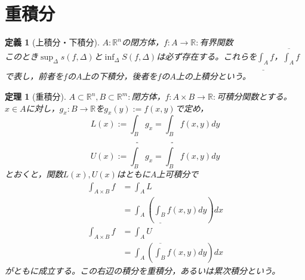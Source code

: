 \documentclass[dvipdfmx,a4j,10pt]{jsarticle}
\theoremstyle{mystyle1}
\newtheorem{thm}[dfn]{定理}
\theoremstyle{mystyle2}
\newtheorem{dfn*}{定義}
\begin{document}
\section{重積分}
\begin{dfn*}[上積分・下積分]
	$A:\mathbb{R}^n$の閉方体，$f:A\to\mathbb{R}:$有界関数\\
このとき$\displaystyle\sup_{\Delta}s(f,\Delta)$と$\displaystyle\inf_{\Delta}S(f,\Delta)$は必ず存在する。これらを$\displaystyle\underline{\int_A} f$，$\displaystyle\overline{\int_A}f$で表し，前者を$f$の$A$上の下積分，後者を$f$の$A$上の上積分という。
\end{dfn*}
\begin{framed}
	\begin{thm}[重積分]\label{th3.10}
			$A\subset\mathbb{R}^n,B\subset\mathbb{R}^m:$閉方体，$f:A\times B\to\mathbb{R}:$可積分関数とする。$x\in A$に対し，$g_x:B\to\mathbb{R}$を$g_x(y):=f(x,y)$で定め，
			\[
				L(x):= \underline{\int_B}g_x= \underline{\int_B}f(x,y) dy
			\]
			\[
				U(x):= \overline{\int_B}g_x= \overline{\int_B}f(x,y) dy
			\]
			とおくと，関数$L(x),U(x)$はともに$A$上可積分で
			\[
			\begin{split}
			\int_{A\times B}f &= \int_A L\\
			&= \int_A\left(\underline{\int_B}f(x,y)dy\right)dx
			\end{split}
			\]
			\[
			\begin{split}
			\int_{A\times B}f &= \int_A U\\
			&= \int_A\left(\overline{\int_B}f(x,y)dy\right)dx
			\end{split}
			\]
			がともに成立する。この右辺の積分を重積分，あるいは累次積分という。
	\end{thm}
\end{framed}
\end{document}
